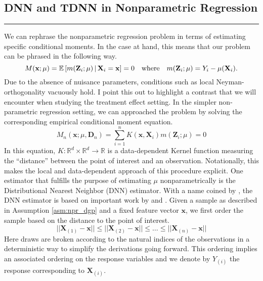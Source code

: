 \subsection{DNN and TDNN in Nonparametric Regression}
\hrule
We can rephrase the nonparametric regression problem in terms of estimating specific conditional moments.
In the case at hand, this means that our problem can be phrased in the following way.
\begin{equation}\label{CondMomEq}
	M(\mathbf{x}; \mu)
	= \mathbb{E}\left[m(\mathbf{Z}_i; \mu) \, | \, \mathbf{X}_i = \mathbf{x}\right]
	= 0
	\quad \text{where} \quad
	m(\mathbf{Z}_i; \mu) = Y_i - \mu(\mathbf{X}_i).
\end{equation}
Due to the absence of nuisance parameters, conditions such as local Neyman-orthogonality vacuously hold.
I point this out to highlight a contrast that we will encounter when studying the treatment effect setting.
In the simpler non-parametric regression setting, we can approached the problem by solving the corresponding empirical conditional moment equation.
\begin{equation}\label{EmpCondMomEq}
	M_n(\mathbf{x}; \mu, \mathbf{D}_n)
	= \sum_{i = 1}^{n}K(\mathbf{x}, \mathbf{X}_i)m(\mathbf{Z}_i; \mu)
	= 0
\end{equation}
In this equation, $K:\mathbb{R}^d \times \mathbb{R}^d \rightarrow \mathbb{R}$ is a data-dependent Kernel function measuring the ``distance'' between the point of interest and an observation.
Notationally, this makes the local and data-dependent approach of this procedure explicit.
One estimator that fulfills the purpose of estimating $\mu$ nonparametrically is the Distributional Nearest Neighbor (DNN) estimator.
With a name coined by \citet{demirkaya_optimal_2024}, the DNN estimator is based on important work by \citet{steele_exact_2009} and \citet{biau_rate_2010}.
Given a sample as described in Assumption \ref{asm:npr_dgp} and a fixed feature vector $\mathbf{x}$, we first order the sample based on the distance to the point of interest.
\begin{equation}\label{eq:ordering}
	||\mathbf{X}_{(1)} - \mathbf{x}|| \leq ||\mathbf{X}_{(2)} - \mathbf{x}|| \leq \dotsc \leq ||\mathbf{X}_{(n)} - \mathbf{x}||
\end{equation}
Here draws are broken according to the natural indices of the observations in a deterministic way to simplify the derivations going forward.
This ordering implies an associated ordering on the response variables and we denote by $Y_{(i)}$ the response corresponding to $\mathbf{X}_{(i)}$.
